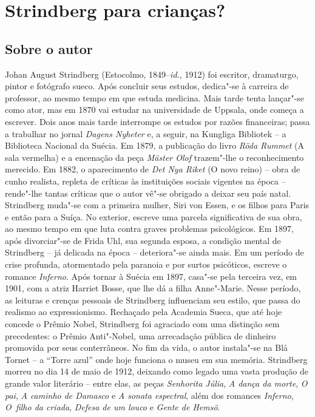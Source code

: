 \chapter{Strindberg para crianças?}

\section{Sobre o autor}

\noindent{}Johan August Strindberg (Estocolmo, 1849--\textit{id.}, 1912) 
foi escritor, dramaturgo, pintor e fotógrafo sueco. Após concluir
seus estudos, dedica"-se à carreira de professor, ao mesmo tempo em que
estuda medicina. Mais tarde tenta lançar"-se como ator, mas em 1870 vai
estudar na universidade de Uppsala, onde começa a escrever. Dois anos
mais tarde interrompe os estudos por razões financeiras; passa a
trabalhar no jornal \textit{Dagens Nyheter} e, a seguir, na
Kungliga Bibliotek -- a Biblioteca Nacional da Suécia.
Em 1879, a publicação do livro \textit{Röda Rummet} (A sala vermelha) e
a encenação da peça \textit{Mäster Olof} trazem"-lhe o reconhecimento
merecido. Em 1882, o aparecimento de \textit{Det Nya Riket} (O novo
reino) -- obra de cunho realista, repleta de críticas às instituições
sociais vigentes na época -- rende"-lhe tantas críticas que o autor vê"-se
obrigado a deixar seu país natal. Strindberg muda"-se com a primeira
mulher, Siri von Essen, e os filhos para Paris e então para a Suíça. No
exterior, escreve uma parcela significativa de sua obra, ao mesmo tempo
em que luta contra graves problemas psicológicos. Em 1897, após
divorciar"-se de Frida Uhl, sua segunda esposa, a condição mental de
Strindberg -- já delicada na época -- deteriora"-se ainda mais. Em um
período de crise profunda, atormentado pela paranoia e por surtos
psicóticos, escreve o romance \textit{Inferno}. Após tornar à Suécia em
1897, casa"-se pela terceira vez, em 1901, com a atriz Harriet Bosse,
que lhe dá a filha Anne"-Marie. Nesse período, as leituras e crenças
pessoais de Strindberg influenciam seu estilo, que passa do realismo ao
expressionismo. Rechaçado pela Academia Sueca, que até 
hoje concede o Prêmio Nobel, Strindberg foi agraciado com uma 
distinção sem precedentes: o Prêmio Anti"-Nobel, uma arrecadação 
pública de dinheiro promovida por seus conterrâneos. 
No fim da vida, o autor instala"-se na Blå Tornet -- a “Torre azul” 
onde hoje funciona o museu em sua memória.
Strindberg morreu no dia 14 de maio de 1912, deixando como legado uma
vasta produção de grande valor literário -- entre elas, as peças
\textit{Senhorita Júlia}, \textit{A dança da morte}, \textit{O pai},
\textit{A caminho de Damasco} e \textit{A sonata espectral}, além dos
romances \textit{Inferno}, \textit{O~filho da criada}, \textit{Defesa
de um louco} e \textit{Gente de Hemsö}.

